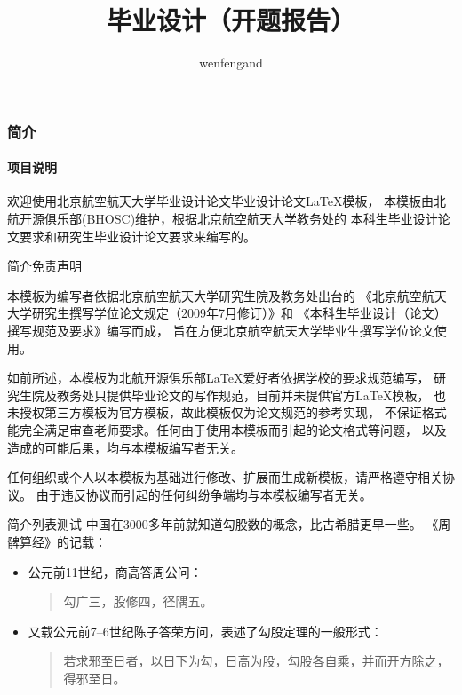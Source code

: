 \documentclass{beamer}
\author{wenfengand}
\title{毕业设计（开题报告）}
\begin{document}
\begin{frame}
\frametitle{简介}
\framesubtitle{项目说明}
欢迎使用北京航空航天大学毕业设计论文毕业设计论文\LaTeX{}模板，
本模板由北航开源俱乐部(BHOSC)维护，根据北京航空航天大学教务处的
本科生毕业设计论文要求和研究生毕业设计论文要求来编写的。
\end{frame}

\begin{frame}{简介}{免责声明}

本模板为编写者依据北京航空航天大学研究生院及教务处出台的
《北京航空航天大学研究生撰写学位论文规定（2009年7月修订）》和
《本科生毕业设计（论文）撰写规范及要求》编写而成，
旨在方便北京航空航天大学毕业生撰写学位论文使用。

如前所述，本模板为北航开源俱乐部\LaTeX{}爱好者依据学校的要求规范编写，
研究生院及教务处只提供毕业论文的写作规范，目前并未提供官方\LaTeX{}模板，
也未授权第三方模板为官方模板，故此模板仅为论文规范的参考实现，
不保证格式能完全满足审查老师要求。任何由于使用本模板而引起的论文格式等问题，
以及造成的可能后果，均与本模板编写者无关。

任何组织或个人以本模板为基础进行修改、扩展而生成新模板，请严格遵守相关协议。
由于违反协议而引起的任何纠纷争端均与本模板编写者无关。

\end{frame}

\begin{frame}{简介}{列表测试}
中国在3000多年前就知道勾股数的概念，比古希腊更早一些。
《周髀算经》的记载：
\begin{itemize}
\item 公元前11世纪，商高答周公问：
\begin{quote}
勾广三，股修四，径隅五。
\end{quote}
\item 又载公元前7--6世纪陈子答荣方问，表述了勾股定理的一般形式：
\begin{quote}
若求邪至日者，以日下为勾，日高为股，勾股各自乘，并而开方除之，得邪至日。
\end{quote}
\end{itemize}
\end{frame}
\end{document}
